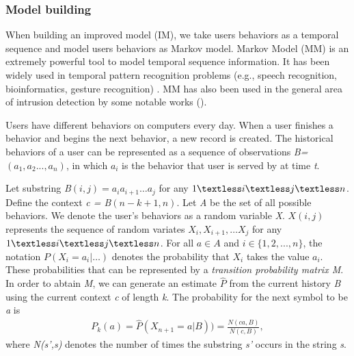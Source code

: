 \documentclass[conference]{IEEEtran}
\begin{document}
\subsubsection{Model building}

When building an improved model (IM), we take users behaviors as a temporal sequence and model users behaviors as Markov model.
Markov Model (MM) \cite{b21} is an extremely powerful
tool to model temporal sequence information. It has been
widely used in temporal pattern recognition problems (e.g.,
speech recognition, bioinformatics, gesture recognition) \cite{b23}. MM has also been used
in the general area of intrusion detection by some notable
works (\cite{b21}).

Users have different behaviors on computers every day. When a user finishes a behavior and begins the next behavior, a new record is created. 
The historical behaviors of a user can be represented as a sequence of observations \emph{B=$(a_1,a_2...,a_n)$}, in which \emph{$a_i$} is the behavior that user is served by at time \emph{t}. 

Let substring \emph{B$(i, j) = a_ia_{i+1}\ldots a_j$} for any \emph{$1 \textless i \textless j \textless n$}. Define the context \emph{c = B$(n-k+1,n)$}. Let \emph{A} be the set of all possible behaviors. 
We denote the user’s behaviors as a random variable \emph{X}. \emph{$X(i,j)$} represents the sequence of random variates \emph{$X_i, X_{i+1},\ldots X_j$} for any \emph{$1\textless i \textless j \textless n$}. 
For all \emph{$a \in A $} and \emph{$i \in \{1,2,. . ., n\}$}, the notation \emph{$P(X_i = a_i|\ldots)$} denotes the probability that \emph{$X_i$} takes the value \emph{$a_i$}.
These probabilities that can be represented by a \emph{transition
probability matrix M}. 
In order to abtain \emph{M}, we can generate an estimate \emph{$\hat P$} from the current history \emph{B} using the current context \emph{c} of length \emph{k}. The probability for the next symbol to be \emph{a} is
\begin{align}
    P_k(a)=\hat P(X_{n+1}=a|B))= \frac {N(ca,B)}{N(c,B)},
\end{align}
where \emph{N(s',s)} denotes the number of times the substring \emph{s'} occurs in the string \emph{s}.

\end{document}
